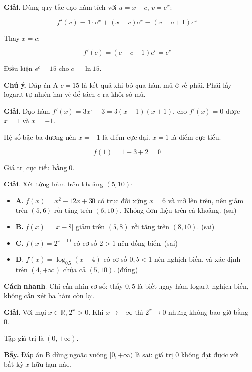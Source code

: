 \documentclass[11pt, a4paper]{article}
\begin{document}
\begin{dapan}[6 — Đáp án C]
\textbf{Giải.} Dùng quy tắc đạo hàm tích với $u = x - c$, $v = e^x$:

$$f'(x) = 1 \cdot e^x + (x - c)e^x = (x - c + 1)e^x$$

Thay $x = c$:

$$f'(c) = (c - c + 1)e^c = e^c$$

Điều kiện $e^c = 15$ cho $c = \ln 15$.

\textbf{Chú ý.} Đáp án A $c = 15$ là kết quả khi bỏ qua hàm mũ ở vế phải. Phải lấy logarit tự nhiên hai vế để tách $c$ ra khỏi số mũ.
\end{dapan}

\begin{dapan}[7 — Đáp án B]
\textbf{Giải.} Đạo hàm $f'(x) = 3x^2 - 3 = 3(x-1)(x+1)$, cho $f'(x) = 0$ được $x = 1$ và $x = -1$.

Hệ số bậc ba dương nên $x = -1$ là điểm cực đại, $x = 1$ là điểm cực tiểu.

$$f(1) = 1 - 3 + 2 = 0$$

Giá trị cực tiểu bằng $0$.
\end{dapan}

\begin{dapan}[8 — Đáp án D]
\textbf{Giải.} Xét từng hàm trên khoảng $(5, 10)$:

\begin{itemize}[leftmargin=1.4em, itemsep=2pt]
\item \textbf{A.} $f(x) = x^2 - 12x + 30$ có trục đối xứng $x = 6$ và mở lên trên, nên giảm trên $(5,6)$ rồi tăng trên $(6,10)$. Không đơn điệu trên cả khoảng. (sai)
\item \textbf{B.} $f(x) = |x - 8|$ giảm trên $(5,8)$ rồi tăng trên $(8,10)$. (sai)
\item \textbf{C.} $f(x) = 2^{x-10}$ có cơ số $2 > 1$ nên đồng biến. (sai)
\item \textbf{D.} $f(x) = \log_{0.5}(x-4)$ có cơ số $0{,}5 < 1$ nên nghịch biến, và xác định trên $(4, +\infty)$ chứa cả $(5,10)$. (đúng)
\end{itemize}


\textbf{Cách nhanh.} Chỉ cần nhìn cơ số: thấy $0{,}5$ là biết ngay hàm logarit nghịch biến, không cần xét ba hàm còn lại.
\end{dapan}

\begin{dapan}[9 — Đáp án A]
\textbf{Giải.} Với mọi $x \in \mathbb{R}$, $2^x > 0$. Khi $x \to -\infty$ thì $2^x \to 0$ nhưng không bao giờ bằng $0$.

Tập giá trị là $(0, +\infty)$.

\textbf{Bẫy.} Đáp án B dùng ngoặc vuông $[0, +\infty)$ là sai: giá trị $0$ không đạt được với bất kỳ $x$ hữu hạn nào.
\end{dapan}
\end{document}
